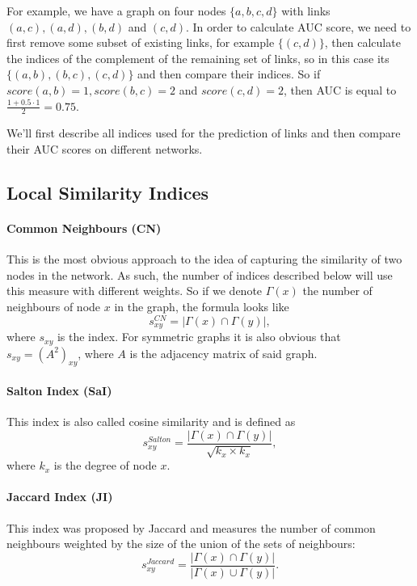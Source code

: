 \documentclass{llncs}
\begin{document}
For example, we have a graph on four nodes $\{a, b, c, d\}$ with links $(a, c), (a, d), (b, d)$ and $(c, d)$. In order to calculate AUC score, we need to first remove some subset of existing links, for example $\{(c, d)\}$, then calculate the indices of the complement of the remaining set of links, so in this case its $\{(a, b), (b, c), (c, d)\}$ and then compare their indices. So if $score(a, b) = 1, score(b, c) = 2$ and $score(c, d) = 2$, then AUC is equal to $\frac{1 + 0.5 \cdot 1}{2} = 0.75$.

We'll first describe all indices used for the prediction of links and then compare their AUC scores on different networks.
%
\subsection{Local Similarity Indices}
%
\paragraph{Common Neighbours (CN)}
%
This is the most obvious approach to the idea of capturing the similarity of two nodes in the network. As such, the number of indices described below will use this measure with different weights. So if we denote $\Gamma(x)$ the number of neighbours of node $x$ in the graph, the formula looks like
\begin{equation}
s_{xy}^{CN} = |\Gamma(x) \cap \Gamma(y)|,
\end{equation}
where $s_{xy}$ is the index. For symmetric graphs it is also obvious that $s_{xy} = (A^2)_{xy}$, where $A$ is the adjacency matrix of said graph.
%
\paragraph{Salton Index (SaI) \cite{salton-index}}
%
This index is also called cosine similarity and is defined as
\begin{equation}
s_{xy}^{Salton} = \frac{|\Gamma(x) \cap \Gamma(y)|}{\sqrt{k_x \times k_x}},
\end{equation}
where $k_x$ is the degree of node $x$.
%
\paragraph{Jaccard Index (JI) \cite{jaccard-index}}
%
This index was proposed by Jaccard and measures the number of common neighbours weighted by the size of the union of the sets of neighbours:
\begin{equation}
s_{xy}^{Jaccard} = \frac{|\Gamma(x) \cap \Gamma(y)|}{|\Gamma(x) \cup \Gamma(y)|}.
\end{equation}
%
\end{document}
